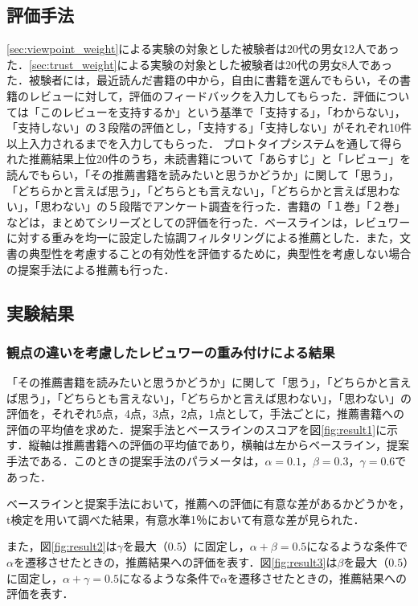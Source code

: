 \documentclass[a4paper,11pt,oneside,openany]{jsbook}
\begin{document}
		\subsection{評価手法}
\ref{sec:viewpoint_weight}による実験の対象とした被験者は20代の男女12人であった．\ref{sec:trust_weight}による実験の対象とした被験者は20代の男女8人であった．被験者には，最近読んだ書籍の中から，自由に書籍を選んでもらい，その書籍のレビューに対して，評価のフィードバックを入力してもらった．評価については「このレビューを支持するか」という基準で「支持する」，「わからない」，「支持しない」の３段階の評価とし，「支持する」「支持しない」がそれぞれ10件以上入力されるまでを入力してもらった．
プロトタイプシステムを通して得られた推薦結果上位20件のうち，未読書籍について「あらすじ」と「レビュー」を読んでもらい，「その推薦書籍を読みたいと思うかどうか」に関して「思う」，「どちらかと言えば思う」，「どちらとも言えない」，「どちらかと言えば思わない」，「思わない」の５段階でアンケート調査を行った．書籍の「１巻」「２巻」などは，まとめてシリーズとしての評価を行った．ベースラインは，レビュワーに対する重みを均一に設定した協調フィルタリングによる推薦とした．また，文書の典型性を考慮することの有効性を評価するために，典型性を考慮しない場合の提案手法による推薦も行った．
		\subsection{実験結果}
		\subsubsection{観点の違いを考慮したレビュワーの重み付けによる結果}
		
「その推薦書籍を読みたいと思うかどうか」に関して「思う」，「どちらかと言えば思う」，「どちらとも言えない」，「どちらかと言えば思わない」，「思わない」の評価を，それぞれ5点，4点，3点，2点，1点として，手法ごとに，推薦書籍への評価の平均値を求めた．提案手法とベースラインのスコアを図\ref{fig:result1}に示す．縦軸は推薦書籍への評価の平均値であり，横軸は左からベースライン，提案手法である．このときの提案手法のパラメータは，$\alpha=0.1$，$\beta=0.3$，$\gamma=0.6$であった．
\par
ベースラインと提案手法において，推薦への評価に有意な差があるかどうかを，t検定を用いて調べた結果，有意水準1％において有意な差が見られた．
\par
また，図\ref{fig:result2}は$\gamma$を最大（$0.5$）に固定し，$\alpha+\beta=0.5$になるような条件で$\alpha$を遷移させたときの，推薦結果への評価を表す．図\ref{fig:result3}は$\beta$を最大（$0.5$）に固定し，$\alpha+\gamma=0.5$になるような条件で$\alpha$を遷移させたときの，推薦結果への評価を表す．
\end{document}
